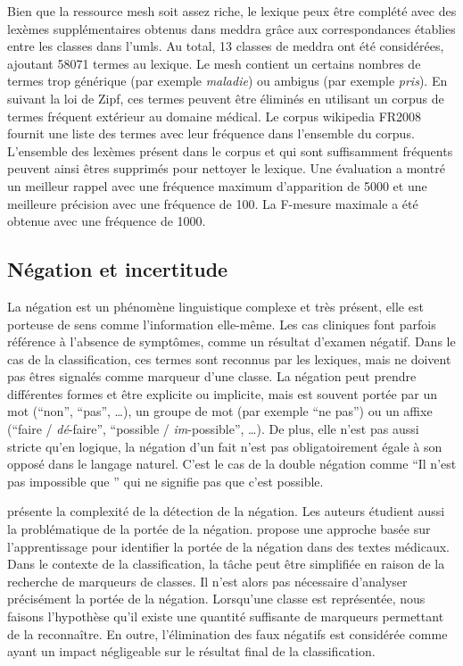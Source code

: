 Bien que la ressource \gls{mesh} soit assez riche, le lexique peux être complété avec des lexèmes supplémentaires obtenus dans \gls{meddra} grâce aux correspondances établies entre les classes dans l'\gls{umls}.
Au total, \num{13} classes de \gls{meddra} ont été considérées, ajoutant \num{58071} termes au lexique.
Le \gls{mesh} contient un certains nombres de termes trop générique (par exemple \emph{maladie}) ou ambigus (par exemple \emph{pris}).
En suivant la loi de Zipf, ces termes peuvent être éliminés en utilisant un corpus de termes fréquent extérieur au domaine médical.
Le corpus \gls{wikipedia} FR2008 \cite{REDACCorpusTexte2008} fournit une liste des termes avec leur fréquence dans l'ensemble du corpus.
L'ensemble des lexèmes présent dans le corpus et qui sont suffisamment fréquents peuvent ainsi êtres supprimés pour nettoyer le lexique.
Une évaluation a montré un meilleur rappel avec une fréquence maximum d'apparition de \num{5000} et une meilleure précision avec une fréquence de \num{100}.
La F-mesure maximale a été obtenue avec une fréquence de \num{1000}.

\subsection{Négation et incertitude}
\label{sec:class:neg}
La négation est un phénomène linguistique complexe et très présent, elle est porteuse de sens comme l'information elle-même.
Les cas cliniques font parfois référence à l'absence de symptômes, comme un résultat d'examen négatif.
Dans le cas de la classification, ces termes sont reconnus par les lexiques, mais ne doivent pas êtres signalés comme marqueur d'une classe.
La négation peut prendre différentes formes et être explicite ou implicite, mais est souvent portée par un mot (\enquote{non}, \enquote{pas}, \dots), un groupe de mot (par exemple \enquote{ne \textelp{} pas}) ou un affixe (\enquote{faire / \emph{dé}-faire}, \enquote{possible / \emph{im}-possible}, \dots).
De plus, elle n'est pas aussi stricte qu'en logique, la négation d'un fait n'est pas obligatoirement égale à son opposé dans le langage naturel.
C'est le cas de la double négation comme \enquote{Il n'est pas impossible que \textelp{}} qui ne signifie pas que c'est possible.

\cite{blancoIssuesDetectingNegation2011} présente la complexité de la détection de la négation.
Les auteurs étudient aussi la problématique de la portée de la négation.
\cite{moranteLearningScopeNegation2008} propose une approche basée sur l'apprentissage pour identifier la portée de la négation dans des textes médicaux.
Dans le contexte de la classification, la tâche peut être simplifiée en raison de la recherche de marqueurs de classes.
Il n'est alors pas nécessaire d'analyser précisément la portée de la négation.
Lorsqu'une classe est représentée, nous faisons l'hypothèse qu'il existe une quantité suffisante de marqueurs permettant de la reconnaître.
En outre, l'élimination des faux négatifs est considérée comme ayant un impact négligeable sur le résultat final de la classification.


